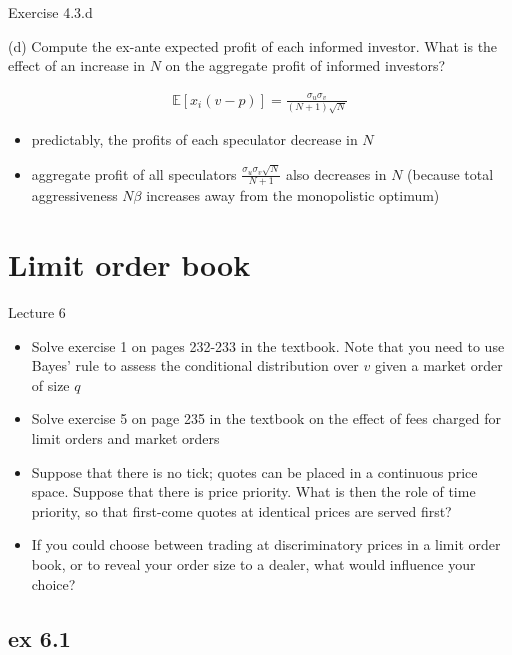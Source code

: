 \documentclass[english,10pt]{beamer}
\begin{document}
\begin{frame}{Exercise 4.3.d}
	\begin{exampleblock}{}
		(d) Compute the ex-ante expected profit of each informed investor. What is the effect of an increase in $N$ on the aggregate profit of informed investors?
	\end{exampleblock}
	
	\begin{align*}
		\mathbb{E} [x_i(v-p)] = \frac{\sigma_u \sigma_v}{(N+1) \sqrt{N}}
	\end{align*}
	\begin{itemize}
		\item predictably, the profits of each speculator decrease in $N$
		\item aggregate profit of all speculators $\frac{\sigma_u \sigma_v \sqrt{N}}{N+1}$ also decreases in $N$ (because total aggressiveness $N \beta$ increases away from the monopolistic optimum)
	\end{itemize}
\end{frame}




\section{Limit order book}

\begin{frame}{Lecture 6}
	\begin{itemize}
		\item Solve exercise 1 on pages 232-233 in the textbook. Note that you need to use Bayes' rule to assess the conditional distribution over $v$ given a market order of size $q$
		\item Solve exercise 5 on page 235 in the textbook on the effect of fees charged for limit orders and market orders
		\item Suppose that there is no tick; quotes can be placed in a continuous price space. Suppose that there is price priority. What is then the role of time priority, so that first-come quotes at identical prices are served first?
		\item If you could choose between trading at discriminatory prices in a limit order book, or to reveal your order size to a dealer, what would influence your choice?
	\end{itemize}
\end{frame}




\subsection{ex 6.1}
\end{document}
